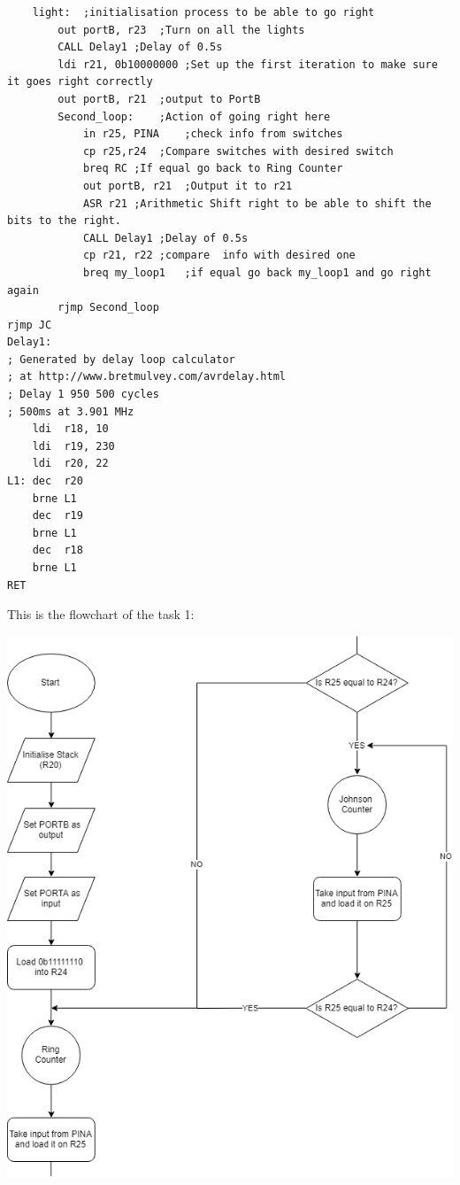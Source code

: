 \documentclass[a4paper,12pt]{article}
\begin{document}
\begin{lstlisting}
	light:	;initialisation process to be able to go right
		out portB, r23	;Turn on all the lights
		CALL Delay1	;Delay of 0.5s
		ldi r21, 0b10000000	;Set up the first iteration to make sure it goes right correctly 
		out portB, r21	;output to PortB
		Second_loop:	;Action of going right here
			in r25, PINA	;check info from switches
			cp r25,r24	;Compare switches with desired switch
			breq RC	;If equal go back to Ring Counter
			out portB, r21	;Output it to r21
			ASR r21	;Arithmetic Shift right to be able to shift the bits to the right.
			CALL Delay1	;Delay of 0.5s
			cp r21, r22 ;compare  info with desired one 
			breq my_loop1	;if equal go back my_loop1 and go right again
		rjmp Second_loop
rjmp JC
Delay1:
; Generated by delay loop calculator
; at http://www.bretmulvey.com/avrdelay.html
; Delay 1 950 500 cycles
; 500ms at 3.901 MHz
    ldi  r18, 10
    ldi  r19, 230
    ldi  r20, 22
L1: dec  r20
    brne L1
    dec  r19
    brne L1
    dec  r18
    brne L1
RET
\end{lstlisting}
This is the flowchart of the task 1:
\begin{center}
\includegraphics[scale=0.7]{img/Task1.png}
\end{center}
\newpage
\end{document}
